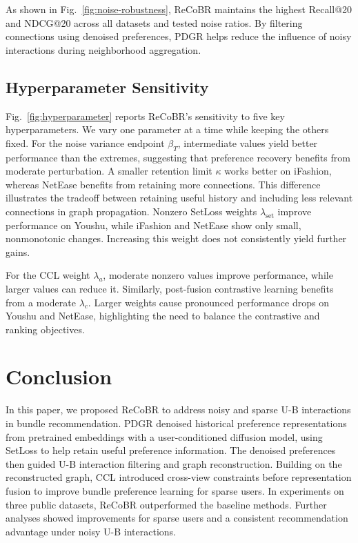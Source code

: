 \documentclass[letterpaper,journal]{IEEEtran}
\begin{document}
As shown in Fig.~\ref{fig:noise-robustness}, ReCoBR maintains
the highest Recall@20 and NDCG@20 across all datasets and
tested noise ratios. By filtering connections using denoised
preferences, PDGR helps reduce the influence of noisy interactions
during neighborhood aggregation.

\subsection{Hyperparameter Sensitivity}

Fig.~\ref{fig:hyperparameter} reports ReCoBR's sensitivity
to five key hyperparameters. We vary one parameter at a time
while keeping the others fixed. For the noise variance endpoint
$\beta_T$, intermediate values yield better performance than
the extremes, suggesting that preference recovery benefits
from moderate perturbation. A smaller retention limit $\kappa$
works better on iFashion, whereas NetEase benefits from
retaining more connections. This difference illustrates the
tradeoff between retaining useful history and including less
relevant connections in graph propagation. Nonzero
SetLoss weights $\lambda_{\mathrm{set}}$ improve performance
on Youshu, while iFashion and NetEase show only small,
nonmonotonic changes. Increasing this weight does not
consistently yield further gains.

For the CCL weight $\lambda_a$, moderate nonzero values improve
performance, while larger values can reduce it. Similarly, post-fusion
contrastive learning benefits from a moderate $\lambda_c$.
Larger weights cause pronounced performance drops on Youshu
and NetEase, highlighting the need to balance the contrastive
and ranking objectives.

\section{Conclusion}

In this paper, we proposed ReCoBR to address noisy and sparse
U-B interactions in bundle recommendation. PDGR denoised historical
preference representations from pretrained embeddings with a
user-conditioned diffusion model, using SetLoss to help retain
useful preference information. The denoised preferences then
guided U-B interaction filtering and graph reconstruction.
Building on the reconstructed graph, CCL introduced cross-view
constraints before representation fusion to improve bundle
preference learning for sparse users. In experiments on three
public datasets, ReCoBR outperformed the baseline methods.
Further analyses showed improvements for sparse users and a
consistent recommendation advantage under noisy U-B interactions.



\end{document}
